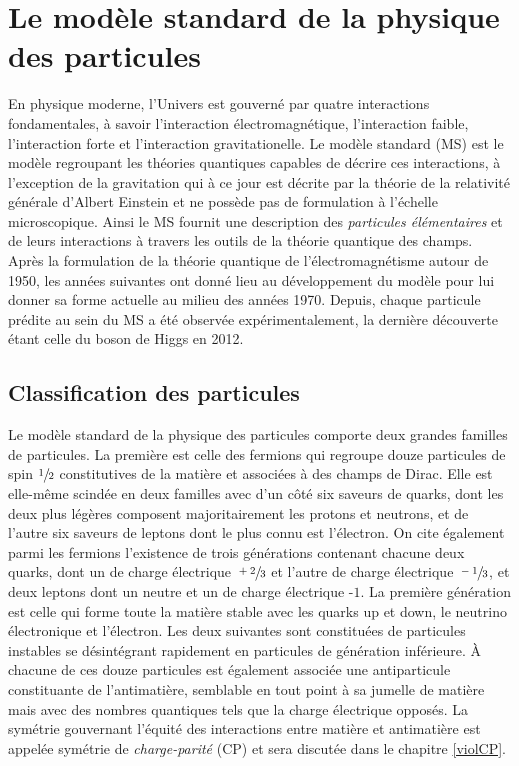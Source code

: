     \chapter{Le modèle standard de la physique des particules}

    En physique moderne, l'Univers est gouverné par quatre interactions fondamentales, à savoir l'interaction électromagnétique, l'interaction faible, l'interaction forte et l'interaction gravitationelle. Le modèle standard (MS) \cite{SM1,SM2,SM3} est le modèle regroupant les théories quantiques capables de décrire ces interactions, à l'exception de la gravitation qui à ce jour est décrite par la théorie de la relativité générale d'Albert Einstein et ne possède pas de formulation à l'échelle microscopique. Ainsi le MS fournit une description des \textit{particules élémentaires} et de leurs interactions à travers les outils de la théorie quantique des champs. Après la formulation de la théorie quantique de l'électromagnétisme autour de 1950, les années suivantes ont donné lieu au développement du modèle pour lui donner sa forme actuelle au milieu des années 1970. Depuis, chaque particule prédite au sein du MS a été observée expérimentalement, la dernière découverte étant celle du boson de Higgs en 2012.

    \section{Classification des particules}

    Le modèle standard de la physique des particules comporte deux grandes familles de particules. La première est celle des fermions qui regroupe douze particules de spin $\sfrac{1}{2}$ constitutives de la matière et associées à des champs de Dirac. Elle est elle-même scindée en deux familles avec d'un côté six saveurs de quarks, dont les deux plus légères composent majoritairement les protons et neutrons, et de l'autre six saveurs de leptons dont le plus connu est l'électron. On cite également parmi les fermions l'existence de trois générations contenant chacune deux quarks, dont un de charge électrique $\sfrac{+2}{3}$ et l'autre de charge électrique $\sfrac{-1}{3}$, et deux leptons dont un neutre et un de charge électrique -$1$. La première génération est celle qui forme toute la matière stable avec les quarks up et down, le neutrino électronique et l'électron. Les deux suivantes sont constituées de particules instables se désintégrant rapidement en particules de génération inférieure. À chacune de ces douze particules est également associée une antiparticule constituante de l'antimatière, semblable en tout point à sa jumelle de matière mais avec des nombres quantiques tels que la charge électrique opposés. La symétrie gouvernant l'équité des interactions entre matière et antimatière est appelée symétrie de \textit{charge-parité} (CP) et sera discutée dans le chapitre \ref{violCP}.

